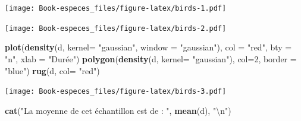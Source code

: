 \documentclass[
]{book}
\newenvironment{Shaded}{\begin{snugshade}}{\end{snugshade}}
\newcommand{\CharTok}[1]{\textcolor[rgb]{0.31,0.60,0.02}{#1}}
\newcommand{\CommentTok}[1]{\textcolor[rgb]{0.56,0.35,0.01}{\textit{#1}}}
\newcommand{\DataTypeTok}[1]{\textcolor[rgb]{0.13,0.29,0.53}{#1}}
\newcommand{\DecValTok}[1]{\textcolor[rgb]{0.00,0.00,0.81}{#1}}
\newcommand{\KeywordTok}[1]{\textcolor[rgb]{0.13,0.29,0.53}{\textbf{#1}}}
\newcommand{\NormalTok}[1]{#1}
\newcommand{\OperatorTok}[1]{\textcolor[rgb]{0.81,0.36,0.00}{\textbf{#1}}}
\newcommand{\StringTok}[1]{\textcolor[rgb]{0.31,0.60,0.02}{#1}}
\begin{document}
\texttt{[image: Book-especes\_files/figure-latex/birds-1.pdf]}

\begin{Shaded}
\end{Shaded}

\texttt{[image: Book-especes\_files/figure-latex/birds-2.pdf]}

\begin{Shaded}
\begin{Highlighting}[]
\KeywordTok{plot}\NormalTok{(}\KeywordTok{density}\NormalTok{(d, }\DataTypeTok{kernel=} \StringTok{"gaussian"}\NormalTok{, }\DataTypeTok{window =} \StringTok{"gaussian"}\NormalTok{),}
     \DataTypeTok{col =} \StringTok{"red"}\NormalTok{, }\DataTypeTok{bty =} \StringTok{"n"}\NormalTok{, }\DataTypeTok{xlab =} \StringTok{"Durée"}\NormalTok{)}
\KeywordTok{polygon}\NormalTok{(}\KeywordTok{density}\NormalTok{(d, }\DataTypeTok{kernel=} \StringTok{"gaussian"}\NormalTok{), }\DataTypeTok{col=}\DecValTok{2}\NormalTok{, }\DataTypeTok{border =} \StringTok{"blue"}\NormalTok{)}
\KeywordTok{rug}\NormalTok{(d, }\DataTypeTok{col=} \StringTok{"red"}\NormalTok{)}
\end{Highlighting}
\end{Shaded}

\texttt{[image: Book-especes\_files/figure-latex/birds-3.pdf]}

\begin{Shaded}
\begin{Highlighting}[]
\KeywordTok{cat}\NormalTok{(}\StringTok{"La moyenne de cet échantillon est de : "}\NormalTok{, }\KeywordTok{mean}\NormalTok{(d), }\StringTok{"}\CharTok{\textbackslash{}n}\StringTok{"}\NormalTok{)}
\end{Highlighting}
\end{Shaded}
\end{document}
